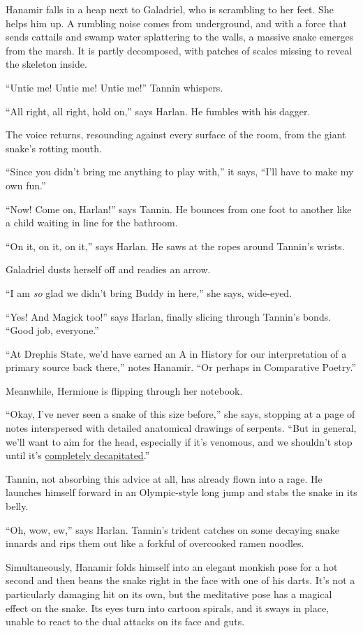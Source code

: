 \documentclass[smalldemyvopaper,11pt,twoside,onecolumn,openright,extrafontsizes]{memoir}
\begin{document}
Hanamir falls in a heap next to Galadriel, who is scrambling to her
feet. She helps him up. A rumbling noise comes from underground, and
with a force that sends cattails and swamp water splattering to the
walls, a massive snake emerges from the marsh. It is partly decomposed,
with patches of scales missing to reveal the skeleton inside.

``Untie me! Untie me! Untie me!'' Tannin whispers.

``All right, all right, hold on,'' says Harlan. He fumbles with his
dagger.

The voice returns, resounding against every surface of the room, from
the giant snake's rotting mouth.

``Since you didn't bring me anything to play with,'' it says, ``I'll
have to make my own fun.''

``Now! Come on, Harlan!'' says Tannin. He bounces from one foot to
another like a child waiting in line for the bathroom.

``On it, on it, on it,'' says Harlan. He saws at the ropes around
Tannin's wrists.

Galadriel dusts herself off and readies an arrow.

``I am \emph{so} glad we didn't bring Buddy in here,'' she says,
wide-eyed.

``Yes! And Magick too!'' says Harlan, finally slicing through Tannin's
bonds. ``Good job, everyone.''

``At Drephis State, we'd have earned an A in History for our
interpretation of a primary source back there,'' notes Hanamir. ``Or
perhaps in Comparative Poetry.''

Meanwhile, Hermione is flipping through her notebook.

``Okay, I've never seen a snake of this size before,'' she says,
stopping at a page of notes interspersed with detailed anatomical
drawings of serpents. ``But in general, we'll want to aim for the head,
especially if it's venomous, and we shouldn't stop until it's
\href{http://www.247wildlife.com/snakekill.html}{completely
decapitated}.''

Tannin, not absorbing this advice at all, has already flown into a rage.
He launches himself forward in an Olympic-style long jump and stabs the
snake in its belly.

``Oh, wow, ew,'' says Harlan. Tannin's trident catches on some decaying
snake innards and rips them out like a forkful of overcooked ramen
noodles.

Simultaneously, Hanamir folds himself into an elegant monkish pose for a
hot second and then beans the snake right in the face with one of his
darts. It's not a particularly damaging hit on its own, but the
meditative pose has a magical effect on the snake. Its eyes turn into
cartoon spirals, and it sways in place, unable to react to the dual
attacks on its face and guts.
\end{document}

